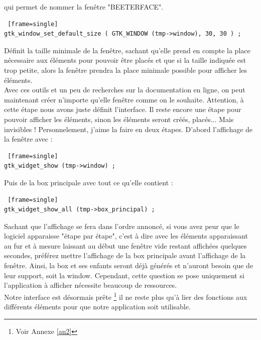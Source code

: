 \documentclass[11pt,french,a4paper]{report}
\begin{document}
qui permet de nommer la fenêtre "BEETERFACE". \\
\begin{lstlisting} [frame=single]
gtk_window_set_default_size ( GTK_WINDOW (tmp->window), 30, 30 ) ; 
\end{lstlisting}
Définit la taille minimale de la fenêtre, sachant qu'elle prend en compte la place nécessaire aux éléments pour pouvoir 
être placés et que si la taille indiquée est trop petite, alors la fenêtre prendra la place minimale possible 
pour afficher les éléments. \\
Avec ces outils et un peu de recherches sur la documentation en ligne, on peut maintenant créer n'importe qu'elle fenêtre 
comme on le souhaite. 
Attention, à cette étape nous avons juste définit l'interface. Il reste encore une étape pour pouvoir afficher les éléments, sinon
les éléments seront créés, placés... Mais invisibles ! 
Personnelement, j'aime la faire en deux étapes. D'abord l'affichage de la fenêtre avec : \\
\begin{lstlisting} [frame=single]
gtk_widget_show (tmp->window) ;
\end{lstlisting}
Puis de la box principale avec tout ce qu'elle contient : \\
\begin{lstlisting} [frame=single]
gtk_widget_show_all (tmp->box_principal) ; 
\end{lstlisting}
Sachant que l'affichage se fera dans l'ordre annoncé, si vous avez peur que le logiciel apparaisse "étape par étape", c'est à 
dire avec les éléments apparaissant au fur et à mesure laissant au début une fenêtre vide restant affichées quelques secondes, 
préférez mettre l'affichage de la box principale avant l'affichage de la fenêtre. Ainsi, la box et ses enfants seront déjà générés 
et n'auront besoin que de leur support, soit la window. Cependant, cette question se pose uniquement si l'application 
à afficher nécessite beaucoup de ressources. \\
Notre interface est désormais prête \footnote{Voir Annexe \ref{an2} }
il ne reste plus qu'à lier des fonctions aux différents éléments pour que notre application soit utilisable.\\
        
\end{document}
